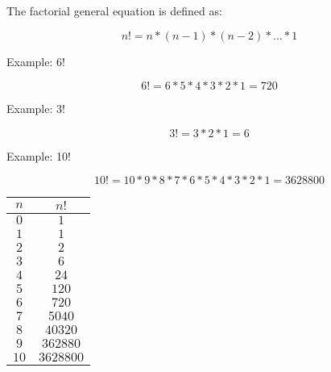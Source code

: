 The factorial general equation is defined as:

\begin{equation}
     n! = n*(n-1)*(n-2)*...*1
\end{equation}

Example: 6!

    \begin{equation}
        6! = 6*5*4*3*2*1 = 720
    \end{equation}

Example: 3!

    \begin{equation}
        3! = 3*2*1 = 6
    \end{equation}

Example: 10!

    \begin{equation}
        10! = 10*9*8*7*6*5*4*3*2*1 = 3628800
    \end{equation}

%    
%

\begin{center}
    \begin{tabular}{|c|c|}    
        \hline	
        $n$ & $n!$ \\ \hline
        $0$ & $1$ \\ \hline
        $1$ & $1$ \\ \hline
        $2$ & $2$ \\ \hline
        $3$ & $6$ \\ \hline
        $4$ & $24$ \\ \hline
        $5$ & $120$ \\ \hline
        $6$ & $720$ \\ \hline
        $7$ & $5040$ \\ \hline
        $8$ & $40320$ \\ \hline
        $9$ & $362880$ \\ \hline
        $10$ & $3628800$ \\ \hline
    \end{tabular}
    \end{center}
    

